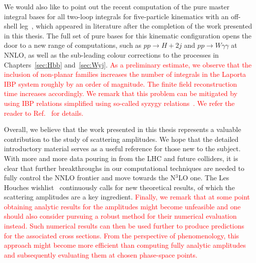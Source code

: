 \documentclass[main.tex]{subfiles}
\begin{document}
\begin{enumerate}
We would also like to point out the recent computation of the pure master integral bases for all two-loop integrals for five-particle kinematics with an off-shell leg~\cite{Abreu:2023rco}, which appeared in literature after the completion of the work presented in this thesis. The full set of pure bases for this kinematic configuration opens the door to a new range of computations, such as $pp \rightarrow H+2j$ and $pp \rightarrow W \gamma \gamma $ at NNLO, as well as the sub-leading colour corrections to the processes in Chapters~\ref{sec:Hbb} and~\ref{sec:Wyj}. \textcolor{red}{As a preliminary estimate, we observe that the inclusion of non-planar families increases the number of integrals in the Laporta IBP system roughly by an order of magnitude. The finite field reconstruction time increases accordingly. We remark that this problem can be mitigated by using IBP relations simplified using so-called syzygy relations~\cite{Gluza:2010ws, 10.1145/1993886.1993902, Schabinger:2011dz, Chen:2015lyz, Bohm:2017qme, Bosma:2018mtf, Boehm:2020zig}. We refer the reader to Ref.~\cite{Wu:2023upw} for details.}

Overall, we believe that the work presented in this thesis represents a valuable contribution to the study of scattering amplitudes. We hope that the detailed introductory material serves as a useful reference for those new to the subject. With more and more data pouring in from the LHC and future colliders, it is clear that further breakthroughs in our computational techniques are needed to fully control the NNLO frontier and move towards the N$^3$LO one. The Les Houches wishlist~\cite{Huss:2022ful} continuously calls for new theoretical results, of which the scattering amplitudes are a key ingredient. \textcolor{red}{Finally, we remark that at some point obtaining analytic results for the amplitudes might become unfeasible and one should also consider pursuing a robust method for their numerical evaluation instead. Such numerical results can then be used further to produce predictions for the associated cross sections. From the perspective of phenomenology, this approach might become more efficient than computing fully analytic amplitudes and subsequently evaluating them at chosen phase-space points.}




\end{enumerate}
\end{document}
